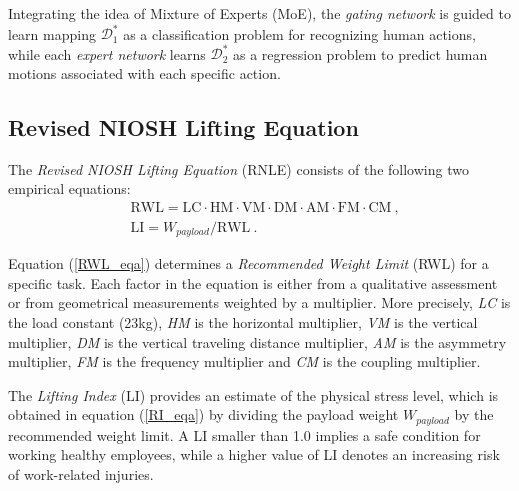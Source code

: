 Integrating the idea of Mixture of Experts (MoE), the \emph{gating network} is guided to learn mapping $\mathcal{D}_1^*$ as a classification problem for recognizing human actions, while each \emph{expert network} learns $\mathcal{D}_2^*$ as a regression problem to predict human motions associated with each specific action.

\subsection{Revised NIOSH Lifting Equation}
\label{sec:RNLE}
The \emph{Revised NIOSH Lifting Equation} (RNLE) consists of the following two empirical equations:
\begin{subequations}
\begin{align} \label{RWL_eqa}
&\text{RWL} = \text{LC}\cdot\text{HM}\cdot\text{VM}\cdot\text{DM}\cdot\text{AM}\cdot\text{FM}\cdot\text{CM} ~,\\
\label{RI_eqa}
&\text{LI} = \text{$W_{payload}$} / \text{RWL} ~.
\end{align}
\end{subequations}

Equation (\ref{RWL_eqa}) determines a \emph{Recommended Weight Limit} (RWL) for a specific task. Each factor in the equation is either from a qualitative assessment or from geometrical measurements weighted by a multiplier. More precisely, \emph{LC} is the load constant (23kg), \emph{HM} is the horizontal multiplier, \emph{VM} is the vertical multiplier, \emph{DM} is the vertical traveling distance multiplier, \emph{AM} is the asymmetry multiplier, \emph{FM} is the frequency multiplier and \emph{CM} is the coupling multiplier. 

The \emph{Lifting Index} (LI) provides an estimate of the physical stress level, which is obtained in equation (\ref{RI_eqa}) by dividing the payload weight \emph{$W_{payload}$} by the recommended weight limit. A LI smaller than 1.0 implies a safe condition for working healthy employees, while a higher value of LI denotes an increasing risk of work-related injuries. 